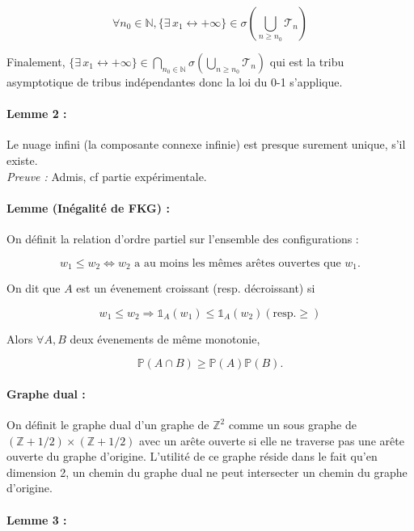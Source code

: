 \documentclass[11pt,a4paper]{article}
\begin{document}
\[\forall n_0 \in \mathbb{N}, \{ \exists\, x_1 \leftrightarrow +\infty \} \in \sigma \left(\bigcup_{n\ge n_0} \mathcal{T}_n\right)\]

Finalement, $\{ \exists\, x_1 \leftrightarrow +\infty \} \in \bigcap_{n_0 \in \mathbb{N}}\sigma \left(\bigcup_{n\ge n_0} \mathcal{T}_n\right)$ qui est la tribu asymptotique de tribus indépendantes donc la loi du 0-1 s'applique.

\paragraph{Lemme 2 :} Le nuage infini (la composante connexe infinie) est presque surement unique, s'il existe. \\

\emph{Preuve :} Admis, cf partie expérimentale.

\paragraph{Lemme (Inégalité de FKG) :}

On définit la relation d'ordre partiel sur l'ensemble des configurations :

\[w_1 \le w_2 \Leftrightarrow w_2 \text{ a au moins les mêmes arêtes ouvertes que }w_1.\]

On dit que $A$ est un évenement croissant (resp. décroissant) si 

\[w_1 \le w_2 \Rightarrow \mathds{1}_A \left(w_1\right) \le \mathds{1}_A \left(w_2\right)  (\text{resp.}\ge) \]

Alors $\forall A, B$ deux évenements de même monotonie, 

\[\mathbb{P}\left(A\cap B\right) \ge \mathbb{P}\left(A\right)\mathbb{P}\left(B\right).\]


\paragraph{Graphe dual :}

On définit le graphe dual d'un graphe de $\mathbb{Z}^2$ comme un sous graphe de $\left(\mathbb{Z} + 1/2\right)\times\left(\mathbb{Z} + 1/2\right)$ avec un arête ouverte si elle ne traverse pas une arête ouverte du graphe d'origine. L'utilité de ce graphe réside dans le fait qu'en dimension 2, un chemin du graphe dual ne peut intersecter un chemin du graphe d'origine.

\paragraph{Lemme 3 : }
\end{document}
